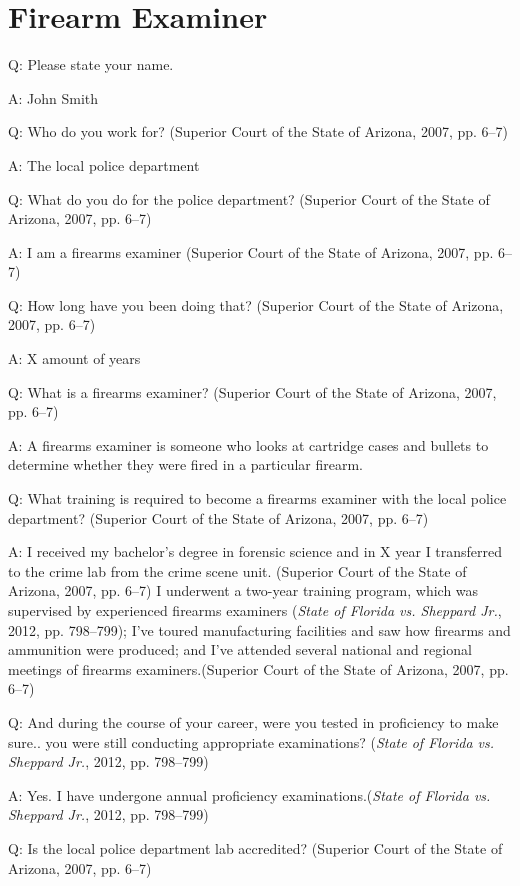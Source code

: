 \documentclass[print]{nuthesis}
\begin{document}
\hypertarget{firearm-examiner}{%
\section{Firearm Examiner}\label{firearm-examiner}}

Q: Please state your name.

A: John Smith

Q: Who do you work for? (Superior Court of the State of Arizona, 2007, pp. 6--7)

A: The local police department

Q: What do you do for the police department? (Superior Court of the State of Arizona, 2007, pp. 6--7)

A: I am a firearms examiner (Superior Court of the State of Arizona, 2007, pp. 6--7)

Q: How long have you been doing that? (Superior Court of the State of Arizona, 2007, pp. 6--7)

A: X amount of years

Q: What is a firearms examiner? (Superior Court of the State of Arizona, 2007, pp. 6--7)

A: A firearms examiner is someone who looks at cartridge cases and bullets to determine whether they were fired in a particular firearm.

Q: What training is required to become a firearms examiner with the local police department? (Superior Court of the State of Arizona, 2007, pp. 6--7)

A: I received my bachelor's degree in forensic science and in X year I transferred to the crime lab from the crime scene unit. (Superior Court of the State of Arizona, 2007, pp. 6--7)
I underwent a two-year training program, which was supervised by experienced firearms examiners (\emph{State of {Florida} vs. Sheppard {Jr.}}, 2012, pp. 798--799);
I've toured manufacturing facilities and saw how firearms and ammunition were produced; and I've attended several national and regional meetings of firearms examiners.(Superior Court of the State of Arizona, 2007, pp. 6--7)

Q: And during the course of your career, were you tested in proficiency to make sure.. you were still conducting appropriate examinations? (\emph{State of {Florida} vs. Sheppard {Jr.}}, 2012, pp. 798--799)

A: Yes. I have undergone annual proficiency examinations.(\emph{State of {Florida} vs. Sheppard {Jr.}}, 2012, pp. 798--799)

Q: Is the local police department lab accredited? (Superior Court of the State of Arizona, 2007, pp. 6--7)
\end{document}
